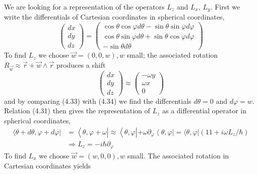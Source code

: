 We are looking for a representation of the operators $L_z$ and $L_x$, $L_y$. First we write the differentials of Cartesian coordinates in spherical coordinates,
\begin{equation}
\left(\begin{array}{c}{d x} \\ {d y} \\ {d z}\end{array}\right)=\left(\begin{array}{c}{\cos \theta \cos \varphi d \theta-\sin \theta \sin \varphi d \varphi} \\ {\cos \theta \sin \varphi d \theta+\sin \theta \cos \varphi d \varphi} \\ {-\sin \theta d \theta}\end{array}\right)
\end{equation}
To find $L_z$ we choose $\vec{w} = (0, 0, w), w$ small; the associated rotation $R_{\vec{w}} \approx \vec{r} + \vec{w} \wedge \vec{r}$ produces a shift
\begin{equation}
\left(\begin{array}{l}{d x} \\ {d y} \\ {d z}\end{array}\right) \approx\left(\begin{array}{c}{-\omega y} \\ {\omega x} \\ {0}\end{array}\right)
\end{equation}
and by comparing (4.33) with (4.34) we find the differentials $d\theta = 0$ and $d\varphi = w$. Relation (4.31) then gives the representation of $L_z$ as a differential operator in spherical coordinates,
\begin{equation}
\begin{aligned}\langle\theta+ d \theta, \varphi+d \varphi| &=\left\langle\theta, \varphi+\omega\left|\approx\left\langle\theta, \varphi\left|+\omega \partial_{\varphi}\left\langle\theta, \varphi\left|=\langle\theta, \varphi|\left(11+i \omega L_{z} / \hbar\right)\right.\right.\right.\right.\right.\right.\\ & \Rightarrow L_{z}=-i \hbar \partial_{\varphi} \end{aligned}
\end{equation}
To find $L_x$ we choose $\vec{w} = (w, 0, 0), w$ small. The associated rotation in Cartesian coordinates yields

